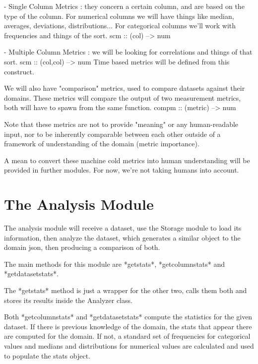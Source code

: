     - Single Column Metrics : they concern a certain column, and are based on the type of the column.
        For numerical columns we will have things like median, averages, deviations, distributions...
        For categorical columns we'll work with frequencies and things of the sort.
        scm :: (col) --> num
        
    - Multiple Column Metrics : we will be looking for correlations and things of that sort.
        scm :: (col,col) --> num 
        Time based metrics will be defined from this construct.

We will also have "comparison" metrics, used to compare datasets against their domains.
These metrics will compare the output of two measurement metrics, both will have to
spawn from the same function.
    compm :: (metric) --> num

Note that these metrics are not to provide "meaning" or any human-readable input, nor to be
inherently comparable between each other outside of a framework of understanding of the domain
(metric importance).

A mean to convert these machine cold metrics into human understanding will be provided in further 
modules. For now, we're not taking humans into account.

\section{The Analysis Module}
\label{cap2:sec:analysis}

The analysis module will receive a dataset, use the Storage module to load its information, then analyze the dataset, which generates a similar object to the domain json, then producing a comparison of both.

The main methods for this module are *getstats*, *getcolumnstats* and *getdatasetstats*.

The *getstats* method is just a wrapper for the other two, calls them both and stores its results inside the Analyzer class.

Both *getcolumnstats* and *getdatasetstats* compute the statistics for the given dataset. If there is previous knowledge of the domain, the stats that appear there are computed for the domain. If not, a standard set of frequencies for categorical values and medians and distributions for numerical values are calculated and used to populate the stats object.

